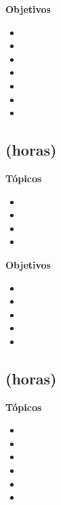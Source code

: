 \textbf{Objetivos}
\begin{itemize}
	\item \ALTRESObjUNO
	\item \ALTRESObjDOS
	\item \ALTRESObjTRES
	\item \ALTRESObjCUATRO
	\item \ALTRESObjCINCO
	\item \ALTRESObjSEIS
	\item \ALTRESObjSIETE
\end{itemize}

\subsection{\ALCUATRODef  (\ALCUATROHours horas)}\label{sec:BOK-AL4}

\textbf{Tópicos}
\begin{itemize}
	\item \ALCUATROTopicConsenso
	\item \ALCUATROTopicDeteccion
	\item \ALCUATROTopicTolerancia
	\item \ALCUATROTopicEstabilizacion
\end{itemize}

\textbf{Objetivos}
\begin{itemize}
	\item \ALCUATROObjUNO
	\item \ALCUATROObjDOS
	\item \ALCUATROObjTRES
	\item \ALCUATROObjCUATRO
	\item \ALCUATROObjCINCO
\end{itemize}

\subsection{\ALCINCODef  (\ALCINCOHours horas)}\label{sec:BOK-AL5}

\textbf{Tópicos}
\begin{itemize}
	\item \ALCINCOTopicMaquinas
	\item \ALCINCOTopicGramaticas
	\item \ALCINCOTopicProblemas
	\item \ALCINCOTopicFunciones
	\item \ALCINCOTopicEl
	\item \ALCINCOTopicImplicaciones
\end{itemize}

